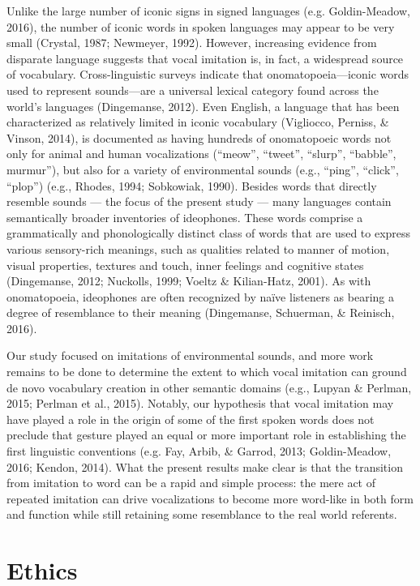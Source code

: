 \documentclass[english,floatsintext,man]{apa6}
\theoremstyle{definition}
\theoremstyle{definition}
\theoremstyle{definition}
\theoremstyle{remark}
\begin{document}
Unlike the large number of iconic signs in signed languages (e.g.
Goldin-Meadow, 2016), the number of iconic words in spoken languages may
appear to be very small (Crystal, 1987; Newmeyer, 1992). However,
increasing evidence from disparate language suggests that vocal
imitation is, in fact, a widespread source of vocabulary.
Cross-linguistic surveys indicate that onomatopoeia---iconic words used
to represent sounds---are a universal lexical category found across the
world's languages (Dingemanse, 2012). Even English, a language that has
been characterized as relatively limited in iconic vocabulary
(Vigliocco, Perniss, \& Vinson, 2014), is documented as having hundreds
of onomatopoeic words not only for animal and human vocalizations
(\enquote{meow}, \enquote{tweet}, \enquote{slurp}, \enquote{babble},
murmur''), but also for a variety of environmental sounds (e.g.,
\enquote{ping}, \enquote{click}, \enquote{plop}) (e.g., Rhodes, 1994;
Sobkowiak, 1990). Besides words that directly resemble sounds --- the
focus of the present study --- many languages contain semantically
broader inventories of ideophones. These words comprise a grammatically
and phonologically distinct class of words that are used to express
various sensory-rich meanings, such as qualities related to manner of
motion, visual properties, textures and touch, inner feelings and
cognitive states (Dingemanse, 2012; Nuckolls, 1999; Voeltz \&
Kilian-Hatz, 2001). As with onomatopoeia, ideophones are often
recognized by naïve listeners as bearing a degree of resemblance to
their meaning (Dingemanse, Schuerman, \& Reinisch, 2016).

Our study focused on imitations of environmental sounds, and more work
remains to be done to determine the extent to which vocal imitation can
ground de novo vocabulary creation in other semantic domains (e.g.,
Lupyan \& Perlman, 2015; Perlman et al., 2015). Notably, our hypothesis
that vocal imitation may have played a role in the origin of some of the
first spoken words does not preclude that gesture played an equal or
more important role in establishing the first linguistic conventions
(e.g. Fay, Arbib, \& Garrod, 2013; Goldin-Meadow, 2016; Kendon, 2014).
What the present results make clear is that the transition from
imitation to word can be a rapid and simple process: the mere act of
repeated imitation can drive vocalizations to become more word-like in
both form and function while still retaining some resemblance to the
real world referents.

\hypertarget{ethics}{%
\section{Ethics}\label{ethics}}
\end{document}
